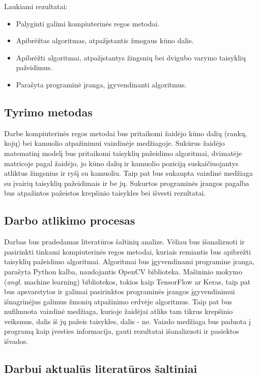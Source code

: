 \documentclass{VUMIFPSbakalaurinis}
\begin{document}
Laukiami rezultatai:
\begin{itemize}[topsep=5pt,itemsep=-1ex,partopsep=2ex,parsep=2ex]
 \item Palyginti galimi kompiuterinės regos metodai.
 \item Apibrėžtas algoritmas, atpažįstantis žmogaus kūno dalis.
 \item Apibrėžti algoritmai, atpažįstantys žingsnių bei dvigubo varymo taisyklių pažeidimus.
 \item Parašyta programinė įranga, įgyvendinanti algoritmus.
\end{itemize}

\subsection{Tyrimo metodas}
Darbe kompiuterinės regos metodai bus pritaikomi žaidėjo kūno dalių (rankų, kojų) bei kamuolio atpažinimui vaizdinėje medžiagoje. Sukūrus žaidėjo matematinį modelį bus pritaikomi taisyklių pažeidimo algoritmai, dvimatėje matricoje pagal žaidėjo, jo kūno dalių ir kamuolio poziciją suskaičiuojantys atliktus žingsnius ir ryšį su kamuoliu. Taip pat bus sukaupta vaizdinė medžiaga su įvairių taisyklių pažeidimais ir be jų. Sukurtos programinės įrangos pagalba bus atpažintos pažeistos krepšinio taisykles bei išvesti rezultatai.

\subsection{Darbo atlikimo procesas}
Darbas bus pradedamas literatūros šaltinių analize. Vėliau bus išanalizuoti ir pasirinkti tinkami kompiuterinės regos metodai, kuriais remiantis bus apibrėžti taisyklių pažeidimo algoritmai. Algoritmai bus įgyvendinami programine įranga, parašyta Python kalba, naudojantis OpenCV biblioteka. Mašininio mokymo (\textit{angl.} machine learning) bibliotekos, tokios kaip TensorFlow ar Keras, taip pat bus apsvarstytos ir galimai pasirinktos programinės įrangos įgyvendinimui išnagrinėjus galimus žmonių atpažinimo erdvėje algoritmus. Taip pat bus nufilmuota vaizdinė medžiaga, kurioje žaidėjai atliks tam tikrus krepšinio veiksmus, dalis iš jų pažeis taisykles, dalis - ne. Vaizdo medžiaga bus paduota į programą kaip įvesties informacija, gauti rezultatai išanalizuoti ir pasiektos išvados. 

\subsection{Darbui aktualūs literatūros šaltiniai}
\end{document}

